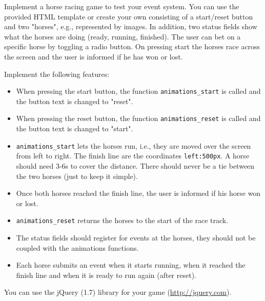 \documentclass{./handout}
\begin{document}
\begin{subtask}
Implement a horse racing game to test your event system. You can use the provided HTML template or create your own consisting of a start/reset button and two "horses", e.g., represented by images. In addition, two status fields show what the horses are doing (ready, running, finished). The user can bet on a specific horse by toggling a radio button. On pressing start the horses race across the screen and the user is informed if he has won or lost.

Implement the following features:
\begin{itemize}
	\item When pressing the start button, the function \texttt{animations\_start} is called and the button text is changed to "reset".
	\item When pressing the reset button, the function  \texttt{animations\_reset} is called and the button text is changed to "start".
	\item \texttt{animations\_start} lets the horses run, i.e., they are moved over the screen from left to right. The finish line are the coordinates \texttt{left:500px}. A horse should need 3-6s to cover the distance. There should never be a tie between the two horses (just to keep it simple).
	\item Once both horses reached the finish line, the user is informed if his horse won or lost.
	\item \texttt{animations\_reset} returns the horses to the start of the race track.
	\item The status fields should register for events at the horses, they should not be coupled with the animations functions.
	\item Each horse submits an event when it starts running, when it reached the finish line and when it is ready to run again (after reset).
\end{itemize}
You can use the jQuery (1.7) library for your game (\url{http://jquery.com}).
\end{subtask}
%	
\end{document}
